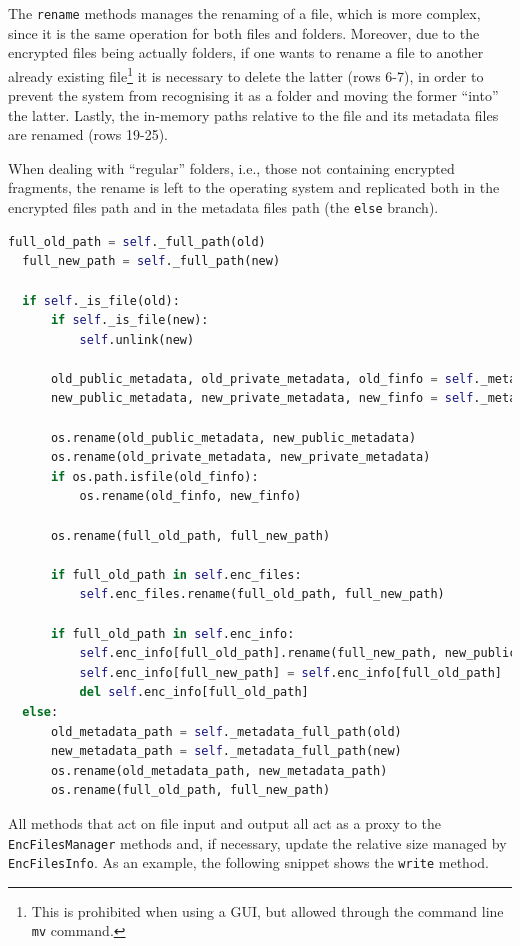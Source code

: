\documentclass[a4paper,12pt,twoside,openright]{report}
\begin{document}
  The \texttt{rename} methods manages the renaming of a file, which is more complex, since
  it is the same operation for both files and folders.
  Moreover, due to the encrypted files being actually folders, if one wants to rename a file
  to another already existing file\footnote{This is prohibited when using a GUI, but allowed through the command line \texttt{mv} command.}
  it is necessary to delete the latter (rows 6-7), in order to prevent the system from recognising it as a folder
  and moving the former ``into'' the latter.
  Lastly, the in-memory paths relative to the file and its metadata files are renamed (rows 19-25).

  When dealing with ``regular'' folders, i.e., those not containing encrypted fragments,
  the rename is left to the operating system and replicated both in the encrypted files path
  and in the metadata files path (the \texttt{else} branch).

  \clearpage
  \begin{lstlisting}[language=Python]
  full_old_path = self._full_path(old)
  full_new_path = self._full_path(new)

  if self._is_file(old):
      if self._is_file(new):
          self.unlink(new)

      old_public_metadata, old_private_metadata, old_finfo = self._metadata_names(old)
      new_public_metadata, new_private_metadata, new_finfo = self._metadata_names(new)

      os.rename(old_public_metadata, new_public_metadata)
      os.rename(old_private_metadata, new_private_metadata)
      if os.path.isfile(old_finfo):
          os.rename(old_finfo, new_finfo)

      os.rename(full_old_path, full_new_path)

      if full_old_path in self.enc_files:
          self.enc_files.rename(full_old_path, full_new_path)
      
      if full_old_path in self.enc_info:
          self.enc_info[full_old_path].rename(full_new_path, new_public_metadata, new_finfo)
          self.enc_info[full_new_path] = self.enc_info[full_old_path]
          del self.enc_info[full_old_path]
  else:
      old_metadata_path = self._metadata_full_path(old)
      new_metadata_path = self._metadata_full_path(new)            
      os.rename(old_metadata_path, new_metadata_path)
      os.rename(full_old_path, full_new_path)
  \end{lstlisting}

  All methods that act on file input and output all act as a proxy to the \texttt{EncFilesManager}
  methods and, if necessary, update the relative size managed by \texttt{EncFilesInfo}.
  As an example, the following snippet shows the \texttt{write} method.
\end{document}
